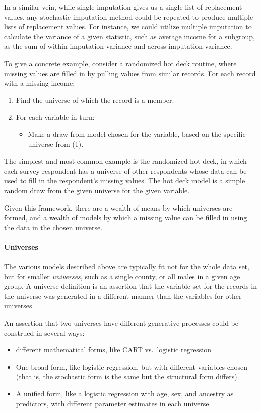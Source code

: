 \documentclass{article}
\def\tighten{ \setlength{\itemsep}{1pt}
    \setlength{\parskip}{0pt}}
\begin{document}
In a similar vein, while single imputation gives us a single list of replacement values, any stochastic 
imputation method could be repeated to produce multiple lists of replacement values. For instance, 
we could utilize multiple imputation to calculate the variance of a given statistic, such as average 
income for a subgroup, as the sum of within-imputation variance and across-imputation variance.

To give a concrete example, consider a randomized hot deck routine, where missing values are
filled in by pulling values from similar records. For each record with a missing income:
\begin{enumerate}
\tighten
\item Find the universe of which the record is a member.
\item For each variable in turn:
    \begin{itemize}
    \item Make a draw from model chosen for the variable, based on the specific universe from (1).
    \end{itemize}
\end{enumerate}


The simplest and most common example is the randomized hot deck, in which each survey respondent 
has a universe of other respondents whose data can be used to fill in the respondent's missing
values. The hot deck model is a simple random draw from the given universe for the given variable.

Given this framework, there are a wealth of means by which universes are formed, and
a wealth of models by which a missing value can be filled in using the data in the chosen universe.

\paragraph{Universes}
The various models described above are typically fit not for the whole data set, but for
smaller {\em universes}, such as a single county, or all males in a given age group.
A universe definition is an assertion that the variable set for the records in the
universe was generated in a different manner than the variables for other universes.

An assertion that two universes have different generative processes could be construed in
several ways:

\begin{itemize}\tighten
\item different mathematical forms, like CART vs.\ logistic regression
\item One broad form, like logistic regression, but with different variables chosen
    (that is, the stochastic form is the same but the structural form differs).
\item A unified form, like a logistic regression with age, sex, and ancestry
    as predictors, with different parameter estimates in each universe.
\end{itemize}
\end{document}
